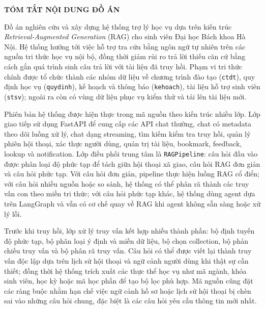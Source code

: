 \documentclass[../DoAn.tex]{subfiles}
\begin{document}
\begin{center}
    \Large{\textbf{TÓM TẮT NỘI DUNG ĐỒ ÁN}}\\
\end{center}
\vspace{1cm}

Đồ án nghiên cứu và xây dựng hệ thống trợ lý học vụ dựa trên kiến trúc
\textit{Retrieval-Augmented Generation} (RAG) cho sinh viên Đại học Bách khoa
Hà Nội. Hệ thống hướng tới việc hỗ trợ tra cứu bằng ngôn ngữ tự nhiên trên các
nguồn tri thức học vụ nội bộ, đồng thời giảm rủi ro trả lời thiếu căn cứ bằng
cách gắn quá trình sinh câu trả lời với tài liệu đã truy hồi. Phạm vi tri thức
chính được tổ chức thành các nhóm dữ liệu về chương trình đào tạo
(\texttt{ctdt}), quy định học vụ (\texttt{quydinh}), kế hoạch và thông báo
(\texttt{kehoach}), tài liệu hỗ trợ sinh viên (\texttt{stsv}); ngoài ra còn có
vùng dữ liệu phục vụ kiểm thử và tải lên tài liệu mới.

Phiên bản hệ thống được hiện thực trong mã nguồn theo kiến trúc nhiều lớp. Lớp
giao tiếp sử dụng FastAPI để cung cấp các API chat thường, chat có metadata theo
dõi luồng xử lý, chat dạng streaming, tìm kiếm kiểm tra truy hồi, quản lý phiên
hội thoại, xác thực người dùng, quản trị tài liệu, bookmark, feedback, lookup và
notification. Lớp điều phối trung tâm là \texttt{RAGPipeline}: câu hỏi đầu vào
được phân loại độ phức tạp để tách giữa hội thoại xã giao, câu hỏi RAG đơn giản
và câu hỏi phức tạp. Với câu hỏi đơn giản, pipeline thực hiện luồng RAG cổ điển;
với câu hỏi nhiều nguồn hoặc so sánh, hệ thống có thể phân rã thành các truy vấn
con theo miền tri thức; với câu hỏi phức tạp khác, hệ thống dùng agent dựa trên
LangGraph và vẫn có cơ chế quay về RAG khi agent không sẵn sàng hoặc xử lý lỗi.

Trước khi truy hồi, lớp xử lý truy vấn kết hợp nhiều thành phần: bộ định tuyến
độ phức tạp, bộ phân loại ý định và miền dữ liệu, bộ chọn collection, bộ phản
chiếu truy vấn và bộ phân rã truy vấn. Câu hỏi có thể được viết lại thành truy
vấn độc lập dựa trên lịch sử hội thoại và ngữ cảnh người dùng khi thật sự cần
thiết; đồng thời hệ thống trích xuất các thực thể học vụ như mã ngành, khóa sinh
viên, học kỳ hoặc mã học phần để tạo bộ lọc phù hợp. Mã nguồn cũng đặt các ràng
buộc nhằm hạn chế việc ngữ cảnh hồ sơ hoặc lịch sử hội thoại bị chèn sai vào
những câu hỏi chung, đặc biệt là các câu hỏi yêu cầu thông tin mới nhất.
\end{document}
